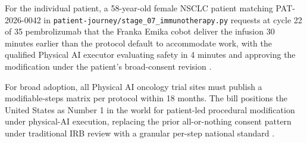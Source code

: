 \hspace{0.5cm} For the individual patient, a 58-year-old female NSCLC patient
matching PAT-2026-0042 in
\texttt{patient-journey/stage\_07\_immunotherapy.py} requests at
cycle 22 of 35 pembrolizumab that the Franka Emika cobot deliver the
infusion 30 minutes earlier than the protocol default to accommodate
work, with the qualified Physical AI executor evaluating safety in
4 minutes and approving the modification under the patient's broad-consent revision \cite{kawchak_2026_19119939, kawchak_2026_18778219}.

For broad adoption, all Physical AI oncology trial sites must
publish a modifiable-steps matrix per protocol within 18 months. The
bill positions the United States as Number 1 in the world for
patient-led procedural modification under physical-AI execution,
replacing the prior all-or-nothing consent pattern under traditional
IRB review with a granular per-step national standard
\cite{kawchak_2026_18973368, kawchak_2026_19119939}.
